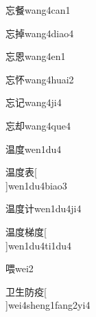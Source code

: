 \begin{verbete}[7;16]{忘餐}{wang4can1}
\end{verbete}

\begin{verbete}[7;11]{忘掉}{wang4diao4}
\end{verbete}

\begin{verbete}[7;10]{忘恩}{wang4en1}
\end{verbete}

\begin{verbete}[7;7]{忘怀}{wang4huai2}
\end{verbete}

\begin{verbete}[7;5]{忘记}{wang4ji4}
\end{verbete}

\begin{verbete}[7;7]{忘却}{wang4que4}
\end{verbete}

\begin{verbete}[12;9]{温度}{wen1du4}
\end{verbete}

\begin{verbete}[12;9;8]{温度表}[\\]{wen1du4biao3}
\end{verbete}

\begin{verbete}[12;9;4]{温度计}{wen1du4ji4}
\end{verbete}

\begin{verbete}[12;9;11;9]{温度梯度}[\\]{wen1du4ti1du4}
\end{verbete}

\begin{verbete}[12]{喂}{wei2}
\end{verbete}

\begin{verbete}[3;5;6;9]{卫生防疫}[\\]{wei4sheng1fang2yi4}
\end{verbete}

